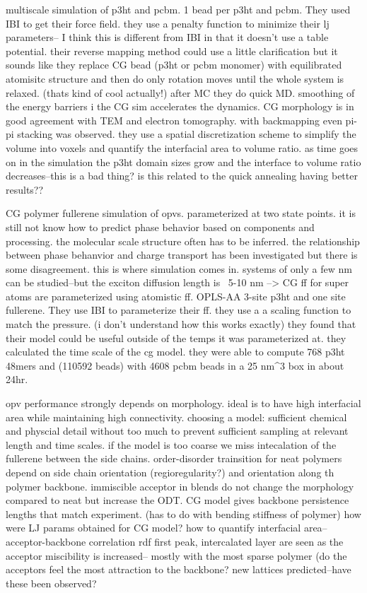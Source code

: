 \documentclass{article}
\begin{document}
\cite{Lee2011}

multiscale simulation of p3ht and pcbm. 1 bead per p3ht and pcbm. They used IBI to get their force field.
they use a penalty function to minimize their lj parameters-- I think this is different from IBI in that it doesn't use a table potential.
their reverse mapping method could use a little clarification but it sounds like they replace CG bead (p3ht or pcbm monomer) with equilibrated atomisitc structure and then do only rotation moves until the whole system is relaxed. (thats kind of cool actually!) after MC they do quick MD. smoothing of the energy barriers i the CG sim accelerates the dynamics. CG morphology is in good agreement with TEM and electron tomography. with backmapping even pi-pi stacking was observed.
they use a spatial discretization scheme to simplify the volume into voxels and quantify the interfacial area to volume ratio. as time goes on in the simulation the p3ht domain sizes grow and the interface to volume ratio decreases--this is a bad thing? is this related to the quick annealing having better results??

\cite{Huang2010}

CG polymer fullerene simulation of opvs.
parameterized at two state points.
it is still not know how to predict phase behavior based on components and processing. the molecular scale structure often has to be inferred. the relationship between phase behanvior and charge transport has been investigated but there is some disagreement.
this is where simulation comes in. systems of only a few nm can be studied--but the exciton diffusion length is ~5-10 nm --> CG
ff for super atoms are parameterized using atomistic ff. OPLS-AA 3-site p3ht and one site fullerene. They use IBI to parameterize their ff. they use a a scaling function to match the pressure. (i don't understand how this works exactly)
they found that their model could be useful outside of the temps it was parameterized at. 
they calculated the time scale of the cg model.
they were able to compute 768 p3ht 48mers and (110592 beads) with 4608 pcbm beads in a 25 nm^3 box in about 24hr.

\cite{Jankowski2013}

opv performance strongly depends on morphology. ideal is to have high interfacial area while maintaining high connectivity. 
choosing a model: sufficient chemical and physcial detail without too much to prevent sufficient sampling at relevant length and time scales. if the model is too coarse we miss intecalation of the fullerene between the side chains. 
order-disorder trainsition for neat polymers depend on side chain orientation (regioregularity?) and orientation along th polymer backbone. 
immiscible acceptor in blends do not change the morphology compared to neat but increase the ODT.
CG model gives backbone persistence lengths that match experiment. (has to do with bending stiffness of polymer)
how were LJ params obtained for CG model?
how to quantify interfacial area--acceptor-backbone correlation rdf first peak, 
intercalated layer are seen as the acceptor miscibility is increased-- mostly with the most sparse polymer (do the acceptors feel the most attraction to the backbone?
new lattices predicted--have these been observed?
\end{document}
